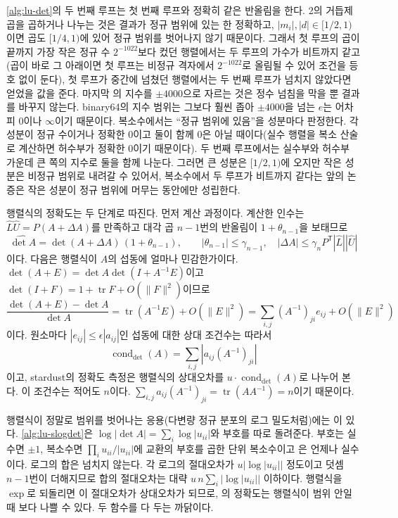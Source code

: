 \cref{alg:lu-det}의 두 번째 루프는 첫 번째 루프와 정확히 같은 반올림을 한다. 2의 거듭제곱을 곱하거나 나누는 것은 결과가 정규 범위에 있는 한 정확하고, $|m_i|,|d|\in[1/2,1)$이면 곱도 $[1/4,1)$에 있어 정규 범위를 벗어나지 않기 때문이다. 그래서 첫 루프의 곱이 끝까지 가장 작은 정규 수 $2^{-1022}$보다 컸던 행렬에서는 두 루프의 가수가 비트까지 같고(곱이 바로 그 아래이면 첫 루프는 비정규 격자에서 $2^{-1022}$로 올림될 수 있어 조건을 등호 없이 둔다), 첫 루프가 중간에 넘쳤던 행렬에서는 두 번째 루프가 넘치지 않았다면 얻었을 값을 준다. 마지막 의 지수를 $\pm4000$으로 자르는 것은 정수 넘침을 막을 뿐 결과를 바꾸지 않는다. binary64의 지수 범위는 그보다 훨씬 좁아 $\pm4000$을 넘는 $e$는 어차피 $0$이나 $\infty$이기 때문이다. 복소수에서는 ``정규 범위에 있음''을 성분마다 판정한다. 각 성분이 정규 수이거나 정확한 $0$이고 둘이 함께 $0$은 아닐 때이다(실수 행렬을 복소 산술로 계산하면 허수부가 정확한 $0$이기 때문이다). 두 번째 루프에서는 실수부와 허수부 가운데 큰 쪽의 지수로 둘을 함께 나눈다. 그러면 큰 성분은 $[1/2,1)$에 오지만 작은 성분은 비정규 범위로 내려갈 수 있어서, 복소수에서 두 루프가 비트까지 같다는 앞의 논증은 작은 성분이 정규 범위에 머무는 동안에만 성립한다.

행렬식의 정확도는 두 단계로 따진다. 먼저 계산 과정이다. 계산한 인수는 $\hat L\hat U=P(A+\Delta A)$를 만족하고 대각 곱 $n-1$번의 반올림이 $1+\theta_{n-1}$을 보태므로
\[
\widehat{\det A}=\det(A+\Delta A)\,(1+\theta_{n-1}),\qquad|\theta_{n-1}|\le\gamma_{n-1},\quad|\Delta A|\le\gamma_nP^{\mathsf T}|\hat L||\hat U|
\]
이다. 다음은 행렬식이 $A$의 섭동에 얼마나 민감한가이다. $\det(A+E)=\det A\det(I+A^{-1}E)$이고 $\det(I+F)=1+\operatorname{tr}F+O(\|F\|^2)$이므로
\[
\frac{\det(A+E)-\det A}{\det A}=\operatorname{tr}(A^{-1}E)+O(\|E\|^2)=\sum_{i,j}(A^{-1})_{ji}e_{ij}+O(\|E\|^2)
\]
이다. 원소마다 $|e_{ij}|\le\epsilon|a_{ij}|$인 섭동에 대한 상대 조건수는 따라서
\[
\operatorname{cond}_{\det}(A)=\sum_{i,j}|a_{ij}(A^{-1})_{ji}|
\]
이고, stardust의 정확도 측정은 행렬식의 상대오차를 $u\cdot\operatorname{cond}_{\det}(A)$로 나누어 본다. 이 조건수는 적어도 $n$이다. $\sum_{i,j}a_{ij}(A^{-1})_{ji}=\operatorname{tr}(AA^{-1})=n$이기 때문이다.

행렬식이 정말로 범위를 벗어나는 응용(다변량 정규 분포의 로그 밀도처럼)에는 이 있다. \cref{alg:lu-slogdet}은 $\log|\det A|=\sum_i\log|u_{ii}|$와 부호를 따로 돌려준다. 부호는 실수면 $\pm1$, 복소수면 $\prod_iu_{ii}/|u_{ii}|$에 교환의 부호를 곱한 단위 복소수이고 은 언제나 실수이다. 로그의 합은 넘치지 않는다. 각 로그의 절대오차가 $u|\log|u_{ii}||$ 정도이고 덧셈 $n-1$번이 더해지므로 합의 절대오차는 대략 $u\,n\sum_i|\log|u_{ii}||$ 이하이다. 행렬식을 $\exp$로 되돌리면 이 절대오차가 상대오차가 되므로, 의 정확도는 행렬식이 범위 안일 때 보다 나쁠 수 있다. 두 함수를 다 두는 까닭이다.

